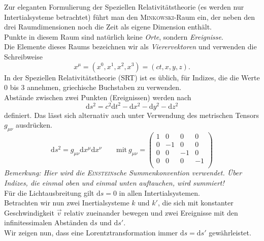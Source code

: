 Zur eleganten Formulierung der Speziellen Relativitätstheorie (es werden nur Intertialsysteme betrachtet) führt man den \textsc{Minkowski}-Raum ein, der neben den drei Raumdimensionen noch die Zeit als eigene Dimension enthält. \\
Punkte in diesem Raum sind natürlich keine \emph{Orte}, sondern \emph{Ereignisse}.\\
Die Elemente dieses Raums bezeichnen wir als \emph{Vierervektoren} und verwenden die Schreibweise
\begin{equation*}
x^\mu = (x^0,x^1,x^2,x^3)=(ct,x,y,z).
\end{equation*}
In der Speziellen Relativitätstheorie (SRT) ist es üblich, für Indizes, die die Werte 0 bis 3 annehmen, griechische Buchstaben zu verwenden.\\

Abstände zwischen zwei Punkten (Ereignissen) werden nach
\begin{equation*}
\mathrm{d}s^2 = c^2\mathrm{d}t^2 -\mathrm{d}x^2 - \mathrm{d}y^2 - \mathrm{d}z^2 
\end{equation*}
definiert. Das lässt sich alternativ auch unter Verwendung des metrischen Tensors $g_{\mu\nu}$ ausdrücken.
\begin{equation*}
\mathrm{d}s^2 = g_{\mu\nu}\mathrm{d}x^\mu\mathrm{d}x^\nu \qquad \text{mit}\ g_{\mu\nu}=\begin{pmatrix}
1 & 0& 0 & 0 \\
0 &-1& 0 & 0\\
0 & 0 & -1 & 0 \\
0 & 0 & 0 & -1 \\
\end{pmatrix}
\end{equation*}
\emph{Bemerkung: Hier wird die \textsc{Einstein}sche Summenkonvention verwendet. Über Indizes, die einmal oben und einmal unten auftauchen, wird summiert!}\\

Für die Lichtausbreitung gilt $\mathrm{d}s=0$ in allen Intertialsystemen. \\
Betrachten wir nun zwei Inertialsysteme $k$ und $k'$, die sich mit konstanter Geschwindigkeit $\vec{v}$ relativ zueinander bewegen und zwei Ereignisse mit den infinitessimalen Abständen $\mathrm{d}s$ und $\mathrm{d}s'$. \\
Wir zeigen nun, dass eine Lorentztransformation immer $\mathrm{d}s=\mathrm{d}s'$ gewährleistet. \\

